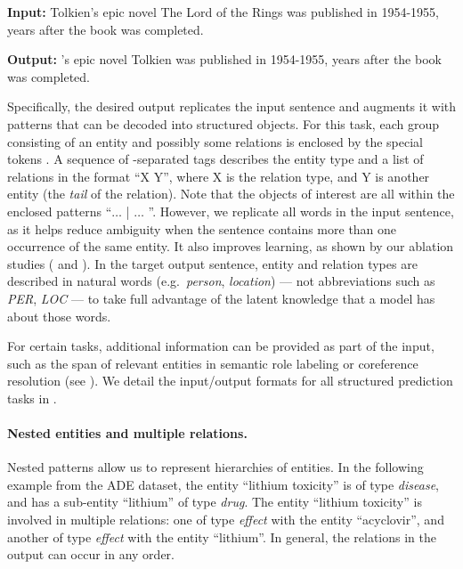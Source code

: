 \begin{footnotesize}
\begin{customquote}
\quotespacestart
    \textbf{Input:} Tolkien's epic novel The Lord of the Rings was published in 1954-1955, years after the book was completed.
    
    \textbf{Output:}
    \nohyphens{\entitybegin {} \separator {} \entityend's epic novel \entitybegin {} \separator {} \separator {} \equals Tolkien \entityend was published in 1954-1955, years after the book was completed.}
    \quotespaceend
\end{customquote}
\end{footnotesize}
Specifically, the desired output replicates the input sentence and augments it with patterns that can be decoded into structured objects. %
For this task, each group consisting of an entity and possibly some relations is enclosed by the special tokens \entitybegin \entityend.
A sequence of \separator-separated tags describes the entity type and a list of relations in the format ``X \equals Y'', where X is the relation type, and Y is another entity (the \emph{tail} of the relation).
Note that the objects of interest are all within the enclosed patterns ``\entitybegin $\ldots$ | $\ldots$ \entityend''. However, we replicate all words in the input sentence, as it
helps reduce ambiguity when the sentence contains more than one occurrence of the same entity.
It also improves learning, as shown by our ablation studies ( and ).
In the target output sentence, entity and relation types are described in natural words (e.g.\ \emph{person}, \emph{location})
--- not abbreviations such as \emph{PER}, \emph{LOC} ---
to take full advantage of the latent knowledge that a \pretrained model has about those words.

For certain tasks, additional information can be provided as part of the input, such as the span of relevant entities in semantic role labeling or coreference resolution (see ).
We detail the input/output formats for all structured prediction tasks in .

\paragraph{Nested entities and multiple relations.} 
Nested patterns allow us to represent hierarchies of entities.
In the following example from the ADE dataset, the entity ``lithium toxicity'' is of type \textit{disease}, and has a sub-entity ``lithium'' of type \textit{drug}.
The entity ``lithium toxicity'' is involved in multiple relations: one of type \textit{effect} with the entity ``acyclovir'', and another of type \textit{effect} with the entity ``lithium''.
In general, the relations in the output can occur in any order. 

